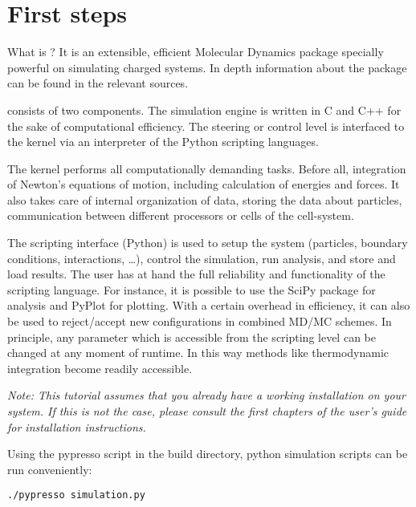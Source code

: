 \documentclass[
paper=a4,                       %
fontsize=11pt,                  %
twoside,                        %
footsepline,                    %
headsepline,                    %
headinclude=false,              %
footinclude=false,              %
pagesize,                       %
]{scrartcl}
\newtheorem{task}{Task}
\begin{document}
\section{First steps}\label{sec:espresso}

What is \es{}? It is an extensible, efficient 
Molecular Dynamics package specially powerful on simulating charged systems. 
In depth information about the package can be found in the relevant sources\cite{esp_url,arnold2003ees,limbach2006ees,arnold13a}.

\es consists of two components.
The simulation engine is written in C and C++ for the sake
of computational efficiency. The steering or control
level is interfaced to the kernel via an interpreter 
of the Python scripting languages.

The kernel performs all computationally demanding tasks. Before all,
integration of Newton's equations of motion, including calculation of
energies and forces. It also takes care of internal organization of
data, storing the data about particles, communication between
different processors or cells of the cell-system. 

The scripting interface (Python) is used to setup the system (particles, boundary conditions,
interactions, \dots), control the simulation, run analysis, and store and load results.
The user has at hand the full reliability and functionality of the scripting language.
For instance, it is possible to use the SciPy package for analysis and PyPlot for plotting.
With a certain overhead in efficiency, it can also be
used to reject/accept new configurations in combined MD/MC schemes. In
principle, any parameter which is accessible from the scripting level can be
changed at any moment of runtime. In this way methods like
thermodynamic integration become readily accessible.

\emph{Note: This tutorial assumes that you already have a working \es{}
installation on your system. If this is not the case, please consult the first
chapters of the user's guide for installation instructions.}


Using the pypresso script in the build directory, python simulation scripts can be run conveniently:

\vspace{0,2cm}
\noindent\texttt{./pypresso simulation.py}

\vspace{1cm}\vspace{1cm}
\end{document}
